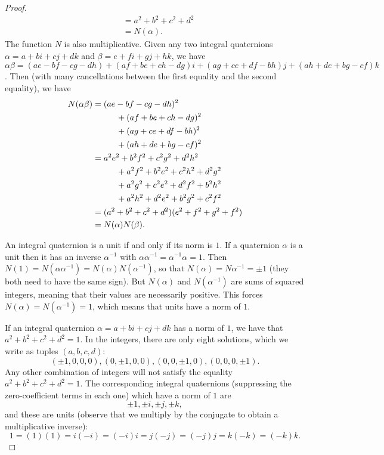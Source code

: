 \documentclass[11pt]{article}
\begin{document}
\begin{enumerate}
\begin{proof}
\begin{align*}
            &= a^2+b^2+c^2+d^2\\
            &= N(\alpha).
        \end{align*}
        The function $N$ is also multiplicative. Given any two integral quaternions $\alpha = a+bi+cj+dk$ and $\beta = e + fi + gj + hk$, we have $\alpha\beta = (ae-bf-cg-dh) + (af+be+ch-dg)i + (ag+ce+df-bh)j+ (ah+de+bg-cf)k$. Then (with many cancellations between the first equality and the second equality), we have\begin{align*}
            N(\alpha\beta) &= (ae-bf-cg-dh)^2\\ &\hspace*{1cm}+ (af+be+ch-dg)^2 \\ &\hspace*{1cm}+ (ag+ce+df-bh)^2 \\ &\hspace*{1cm}+ (ah+de+bg-cf)^2\\
            &= a^2e^2+b^2f^2+c^2g^2+d^2h^2 \\ &\hspace*{1cm}+ a^2f^2+b^2e^2+c^2h^2+d^2g^2 \\ &\hspace*{1cm}+a^2g^2+c^2e^2+d^2f^2+b^2h^2 \\ &\hspace*{1cm}+ a^2h^2+d^2e^2+b^2g^2+c^2f^2\\
            &= (a^2+b^2+c^2+d^2)(e^2+f^2+g^2+f^2)\\
            &= N(\alpha)N(\beta).
        \end{align*}

        An integral quaternion is a unit if and only if its norm is $1$. If a quaternion $\alpha$ is a unit then it has an inverse $\alpha^{-1}$ with $\alpha\alpha^{-1} = \alpha^{-1}\alpha = 1$. Then $N(1) = N(\alpha\alpha^{-1}) = N(\alpha)N(\alpha^{-1})$, so that $N(\alpha) = N\alpha^{-1} = \pm 1$ (they both need to have the same sign). But $N(\alpha)$ and $N(\alpha^{-1})$ are sums of squared integers, meaning that their values are necessarily positive. This forces $N(\alpha) = N(\alpha^{-1}) = 1$, which means that units have a norm of $1$.

        If an integral quaternion $\alpha = a+bi+cj+dk$ has a norm of $1$, we have that $a^2+b^2+c^2+d^2 = 1$. In the integers, there are only eight solutions, which we write as tuples $(a,b,c,d)$: \[(\pm1, 0,0,0), (0,\pm1, 0,0), (0,0,\pm1, 0), (0,0,0, \pm1).\] Any other combination of integers will not satisfy the equality $a^2+b^2+c^2+d^2 = 1$. The corresponding integral quaternions (suppressing the zero-coefficient terms in each one) which have a norm of $1$ are \[\pm 1, \pm i, \pm j, \pm k,\] and these are units (observe that we multiply by the conjugate to obtain a multiplicative inverse): \[1 = (1)(1) = i(-i) = (-i)i = j(-j) = (-j)j = k(-k) = (-k)k.\]


\end{proof}
\end{enumerate}
\end{document}
